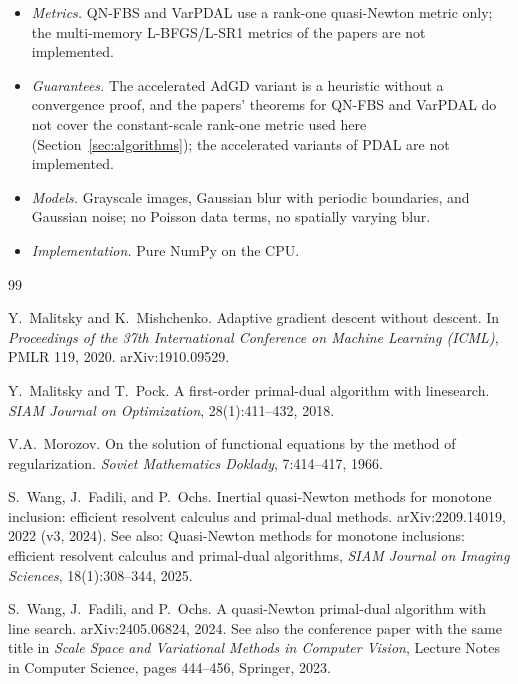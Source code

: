 \documentclass[11pt,a4paper]{article}
\begin{document}
\begin{itemize}
  \item \emph{Metrics.} QN-FBS and VarPDAL use a rank-one quasi-Newton
        metric only; the multi-memory L-BFGS/L-SR1 metrics of the papers are
        not implemented.
  \item \emph{Guarantees.} The accelerated AdGD variant is a heuristic
        without a convergence proof, and the papers' theorems for QN-FBS and
        VarPDAL do not cover the constant-scale rank-one metric used here
        (Section~\ref{sec:algorithms}); the accelerated variants of PDAL are
        not implemented.
  \item \emph{Models.} Grayscale images, Gaussian blur with periodic
        boundaries, and Gaussian noise; no Poisson data terms, no
        spatially varying blur.
  \item \emph{Implementation.} Pure NumPy on the CPU.
\end{itemize}

\begin{thebibliography}{99}

Y.~Malitsky and K.~Mishchenko.
\newblock Adaptive gradient descent without descent.
\newblock In \emph{Proceedings of the 37th International Conference on
  Machine Learning (ICML)}, PMLR 119, 2020.
\newblock arXiv:1910.09529.

Y.~Malitsky and T.~Pock.
\newblock A first-order primal-dual algorithm with linesearch.
\newblock \emph{SIAM Journal on Optimization}, 28(1):411--432, 2018.

V.A.~Morozov.
\newblock On the solution of functional equations by the method of
  regularization.
\newblock \emph{Soviet Mathematics Doklady}, 7:414--417, 1966.

S.~Wang, J.~Fadili, and P.~Ochs.
\newblock Inertial quasi-Newton methods for monotone inclusion: efficient
  resolvent calculus and primal-dual methods.
\newblock arXiv:2209.14019, 2022 (v3, 2024).
\newblock See also: Quasi-Newton methods for monotone inclusions: efficient
  resolvent calculus and primal-dual algorithms, \emph{SIAM Journal on
  Imaging Sciences}, 18(1):308--344, 2025.

S.~Wang, J.~Fadili, and P.~Ochs.
\newblock A quasi-Newton primal-dual algorithm with line search.
\newblock arXiv:2405.06824, 2024.
\newblock See also the conference paper with the same title in
  \emph{Scale Space and Variational Methods in Computer Vision}, Lecture
  Notes in Computer Science, pages 444--456, Springer, 2023.

\end{thebibliography}
\end{document}
